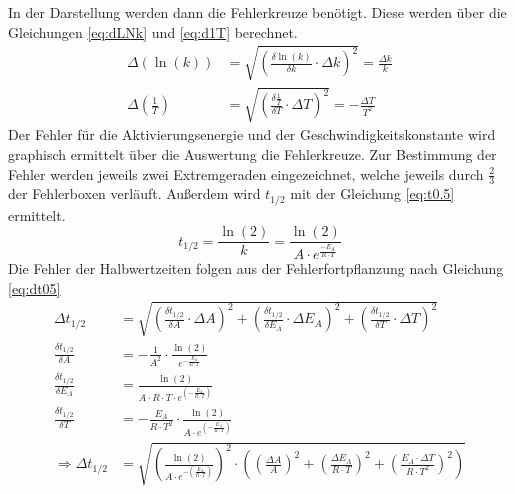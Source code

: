 In der Darstellung werden dann die Fehlerkreuze benötigt.
Diese werden über die Gleichungen \ref{eq:dLNk} und \ref{eq:d1T} berechnet.
\begin{align}
\Delta \left(\ln (k)\right)&=\sqrt{\left(\frac{\delta \ln (k)}{\delta k}\cdot \Delta k \right)^2} = \frac{\Delta k}{k} \label{eq:dLNk}\\
\Delta \left(\frac{1}{T}\right)&=\sqrt{\left(\frac{\delta \frac{1}{T}}{\delta T}\cdot \Delta T \right)^2} = -\frac{\Delta T}{T^2}\label{eq:d1T}
\end{align}
Der Fehler für die Aktivierungsenergie und der Geschwindigkeitskonstante wird graphisch ermittelt über die Auswertung die Fehlerkreuze. 
Zur Bestimmung der Fehler werden jeweils zwei Extremgeraden eingezeichnet, welche jeweils durch $\frac{2}{3}$ der Fehlerboxen verläuft.
Außerdem wird $t_{1/2}$ mit der Gleichung \ref{eq:t0.5} ermittelt.
\begin{equation}
t_{1/2} = \frac{\ln (2)}{k} = \frac{\ln (2)}{A \cdot e^\frac{-E_A}{R\cdot T}}
\label{eq:t0.5}
\end{equation}
Die Fehler der Halbwertzeiten folgen aus der Fehlerfortpflanzung nach Gleichung \ref{eq:dt05}
\begin{align}
\Delta t_{1/2} &= \sqrt{\left(\frac{\delta t_{1/2}}{\delta A}\cdot \Delta A\right)^2 + \left(\frac{\delta t_{1/2}}{\delta E_A}\cdot \Delta E_A\right)^2 +\left(\frac{\delta t_{1/2}}{\delta T}\cdot \Delta T \right)^2}\\
\frac{\delta t_{1/2}}{\delta A} &= - \frac{1}{A^2} \cdot \frac{\ln (2)}{e^{- \frac{E_A}{R \cdot T}}}\\
\frac{\delta t_{1/2}}{\delta E_A} &= \frac{\ln (2)}{A\cdot R \cdot T\cdot e^{\left(- \frac{E_A}{R \cdot T}\right)}} \\
\frac{\delta t_{1/2}}{\delta T} &= - \frac{E_A}{R\cdot T^2}\cdot \frac{\ln (2)}{A\cdot e^{\left(- \frac{E_A}{R \cdot T}\right)}}\\
\Rightarrow \Delta t_{1/2} &= \sqrt{\left(\frac{\ln (2)}{A\cdot e^{- \left(\frac{E_A}{R\cdot T}\right)}}\right)^2 \cdot \left(\left(\frac{\Delta A}{A}\right)^2 + \left(\frac{\Delta E_A}{R\cdot  T}\right)^2 + \left(\frac{E_A \cdot \Delta T}{R\cdot T^2}\right)^2\right)}
\end{align}
